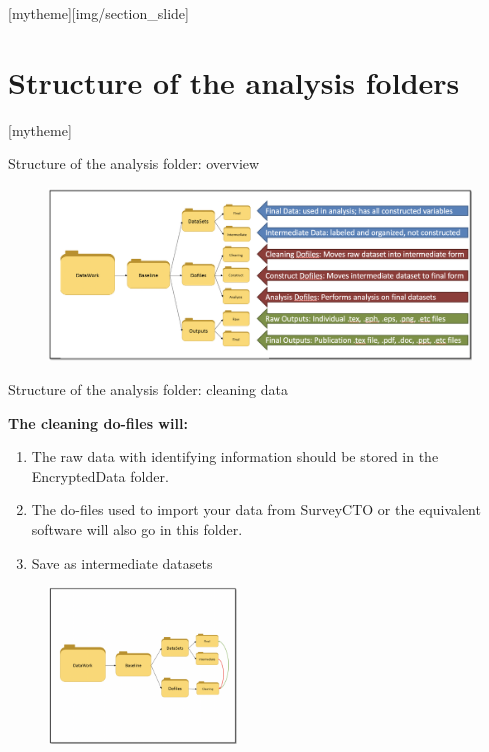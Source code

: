\documentclass[aspectratio=169]{beamer}
\newcommand{\sectionpic}[2]{
	\setbeamertemplate{section page}[mytheme][#2]
	\section{#1}
	\setbeamertemplate{section page}[mytheme]
}
\begin{document}
\sectionpic{Structure of the analysis folders}{img/section_slide}

\begin{frame}{Structure of the analysis folder: overview}

	\begin{figure}
		\centering
		\includegraphics[width=\linewidth]{img/Structure7}
	\end{figure}

\end{frame}

\begin{frame}[fragile]{Structure of the analysis folder: cleaning data}
\begin{multicols}{2}	
	
	\textbf{The cleaning do-files will:}
	
	\begin{enumerate}
		\item<1> The raw data with identifying information should be stored in the EncryptedData folder.
		\item<1> The do-files used to import your data from SurveyCTO or the equivalent software will also go in this folder. 
		\item<1> Save as intermediate datasets
	\end{enumerate}
	
	\begin{figure}
		\centering
		\includegraphics[width=50mm]{img/Structure8}
	\end{figure}
	
\end{multicols}
\end{frame}
\end{document}

